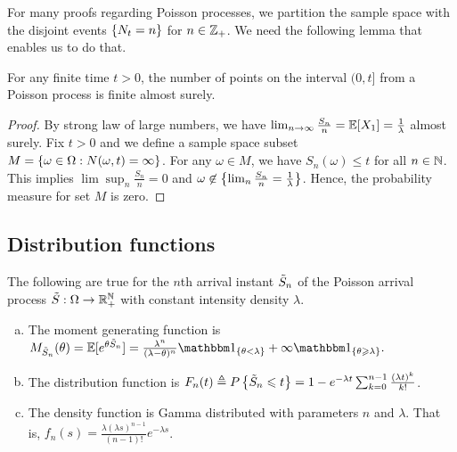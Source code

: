 \documentclass[letterpaper,10pt,english]{article}
\begin{document}
For many proofs regarding Poisson processes, 
we partition the sample space with the disjoint events $\left\{N_t = n\right\}$ for $n \in \mathbb{Z}_+$. 
We need the following lemma that enables us to do that. 
\begin{lem} 
For any finite time $t > 0$, the number of points on the interval $(0,t]$ from a Poisson process is finite almost surely.
\end{lem}
\begin{proof} By strong law of large numbers, we have $\lim_{n \to \infty} \frac{S_{n}}{n} = \mathbb{E}[X_{1}] = \frac{1}{\lambda}$ almost surely. 
Fix $t > 0$ and we define a sample space subset $M = \left\{\omega \in \Omega: N(\omega, t) = \infty \right\}$. 
For any $\omega \in M$, we have $S_{n}(\omega)\le t$ for all $n \in \mathbb{N}$. 
This implies $\lim\sup_n\frac{S_{n}}{n} = 0$  and $\omega \not\in \left\{\lim_n \frac{S_{n}}{n} = \frac{1}{\lambda} \right\}$. 
Hence, the probability measure for set $M$ is zero. 
\end{proof}

\subsection{Distribution functions}
\begin{lem} 
The following are true for the $n$th arrival instant $\tilde{S}_n$ of the Poisson arrival process $\tilde{S}:\Omega\to\mathbb{R}_+^{\mathbb{N}}$ with constant intensity density $\lambda$.
\begin{enumerate}[(a)]
\item The moment generating function is 
$
M_{\tS_n}(\theta) = \E[e^{\theta \tS_n} ] = \frac{\lambda^n}{(\lambda-\theta)^n}\SetIn{\theta < \lambda} + \infty\SetIn{\theta \ge \lambda}.
$ 
\item The distribution function is  
$F_n(t) \triangleq P\left\{\tilde{S}_n \leqslant t\right\} = 1 - e^{-\lambda t}\sum_{k=0}^{n-1}\frac{(\lambda t)^k}{k!}$.
\item The density function is Gamma distributed with parameters $n$ and $\lambda$. That is, $f_{n}(s) =\frac{\lambda (\lambda s)^{n-1}} {(n-1)!} e^{-\lambda s}$. 
\end{enumerate}
\end{lem}
\end{document}
